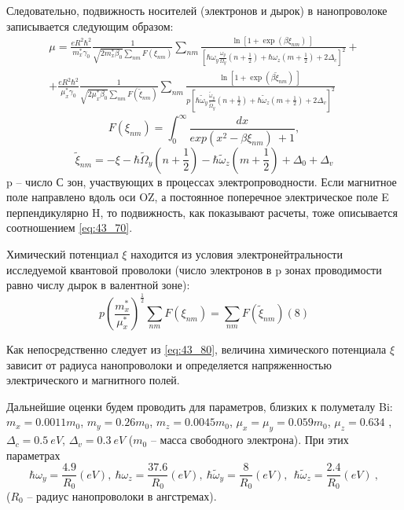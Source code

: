 Следовательно, подвижность носителей (электронов и дырок) в нанопроволоке записывается следующим образом:
\begin{multline} \label{eq:43_70} 
\mu =\frac{eR^2{\hbar }^2}{m^*_x{\gamma }_0}\frac{1}{\sqrt{2m^*_x{\beta }_0}\sum_{nm}{F\left({\xi }_{nm}\right)}}\sum_{nm}{\frac{{\ln \left[1+{\exp \left(\beta {\xi }_{nm}\right)\ }\right]\ }}{{\left[\hbar {\omega }_y\frac{{\omega }_y}{{\Omega }_y}\left(n+\frac{1}{2}\right)+\hbar {\omega }_z\left(m+\frac{1}{2}\right)+2{\Delta }_c\right]}^2}}+\\
+\frac{eR^2{\hbar }^2}{{\mu }^*_x{\gamma }_0}\frac{1}{\sqrt{2{\mu }^*_x{\beta }_0}\sum_{nm}{F\left({\widetilde{\xi }}_{nm}\right)}}\sum_{nm}{\frac{{\ln \left[1+{\exp \left(\beta {\widetilde{\xi }}_{nm}\right)\ }\right]\ }}{p{\left[\hbar {\widetilde{\omega }}_y\frac{{\widetilde{\omega }}_y}{{\widetilde{\Omega }}_y}\left(n+\frac{1}{2}\right)+\hbar {\widetilde{\omega }}_z\left(m+\frac{1}{2}\right)+2{\Delta }_v\right]}^2}} 
\end{multline}
\[
F\left({\xi }_{nm}\right)=\int^{\infty }_0{\frac{dx}{{exp \left(x^2-\beta {\xi }_{nm}\right)\ }+1}},
\]
\[
{\widetilde{\xi }}_{nm}=-\xi -\hbar {\widetilde{\Omega }}_y\left(n+\frac{1}{2}\right)-\hbar {\widetilde{\omega }}_z\left(m+\frac{1}{2}\right)+{\Delta }_0+{\Delta }_v
\]
p -- число С зон, участвующих в процессах электропроводности. Если магнитное поле направлено вдоль оси OZ, а постоянное поперечное электрическое поле E перпендикулярно H, то подвижность, как показывают расчеты, тоже описывается соотношением \eqref{eq:43_70}.

Химический потенциал $\xi $ находится из условия электронейтральности исследуемой квантовой проволоки (число электронов в p зонах проводимости равно числу дырок в валентной зоне):
\begin{equation} \label{eq:43_80} 
p{\left(\frac{m^*_x}{{\mu }^*_x}\right)}^{\frac{1}{2}}\sum_{nm}{F\left({\xi }_{nm}\right)}=\sum_{nm}{F\left({\widetilde{\xi }}_{nm}\right)} (8) 
\end{equation}

Как непосредственно следует из \eqref{eq:43_80}, величина химического потенциала $\xi $ зависит от радиуса нанопроволоки и определяется напряженностью электрического и магнитного полей.

Дальнейшие оценки будем проводить для параметров, близких к полуметалу Bi: $m_x=0.0011m_0$, $m_y=0.26m_0$, $m_z=0.0045m_0$, ${\mu }_x={\mu }_y=0.059m_0$, ${\mu }_z=0.634$ \cite{Levin2009a}, ${\Delta }_c=0.5\ eV$, ${\Delta }_v=0.3\ eV$ ($m_0$ -- масса свободного электрона). При этих параметрах
\[
\hbar {\omega }_y=\frac{4.9}{R_0}\left(eV\right),\ \hbar {\omega }_z=\frac{37.6}{R_0}\left(eV\right),\ \hbar {\widetilde{\omega }}_y=\frac{8}{R_0}\left(eV\right),\ \ \hbar {\widetilde{\omega }}_z=\frac{2.4}{R_0}\left(eV\right)\ ,
\] 
($R_0$ -- радиус нанопроволоки в ангстремах).

